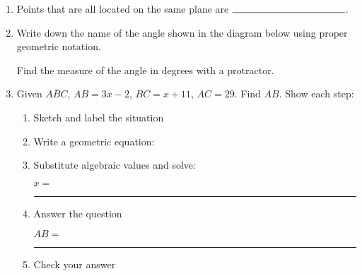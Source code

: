 \documentclass[12pt, oneside]{article}
\begin{document}
\begin{enumerate}
\item Points that are all located on the same plane are $\rule{4cm}{0.15mm}$.

\item Write down the name of the angle shown in the diagram below using proper geometric notation.
  \begin{center}
  \end{center}
  Find the measure of the angle in degrees with a protractor.

\newpage
  \item Given $\overline{ABC}$, $AB=3x-2$, $BC=x+11$, $AC=29$. Find ${AB}$. Show each step:\\[0.35in]
    \begin{flushright}
    \end{flushright}
    \begin{enumerate}
      \item Sketch and label the situation
      \item Write a geometric equation:\\
      \item Substitute algebraic values and solve:
      \vspace{3cm}
      \begin{flushright} $x=$ \rule{1cm}{0.15mm} \end{flushright}
      \item Answer the question\\
      \begin{flushright} $AB=$ \rule{1cm}{0.15mm} \end{flushright}
      \item Check your answer
    \end{enumerate}


\end{enumerate}
\end{document}
